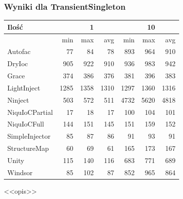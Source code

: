 \documentclass[12pt]{article}
\begin{document}
\subsubsection{Wyniki dla TransientSingleton}
\begin{center}
\begin{small}
	\begin{tabular}{ | l | r r r | r r r | }
    		\hline
Ilość & & 1 & & & 10 & \\ \hline
 & min & max & avg & min & max & avg \\ \hline
Autofac & 77 & 84 & 78 & 893 & 964 & 910 \\ \hline
DryIoc & 905 & 922 & 910 & 936 & 983 & 942 \\ \hline
Grace & 374 & 386 & 376 & 381 & 396 & 383 \\ \hline
LightInject & 1285 & 1358 & 1310 & 1297 & 1360 & 1316 \\ \hline
Ninject & 503 & 572 & 511 & 4732 & 5620 & 4818 \\ \hline
NiquIoCPartial & 17 & 18 & 17 & 100 & 104 & 101 \\ \hline
NiquIoCFull & 144 & 151 & 145 & 151 & 159 & 152 \\ \hline
SimpleInjector & 85 & 87 & 86 & 91 & 93 & 91 \\ \hline
StructureMap & 60 & 69 & 61 & 165 & 173 & 167 \\ \hline
Unity & 115 & 140 & 116 & 683 & 771 & 689 \\ \hline
Windsor & 85 & 102 & 87 & 852 & 965 & 864 \\ \hline
  	\end{tabular}
\end{small}
\end{center}
<<opis>>
\end{document}
